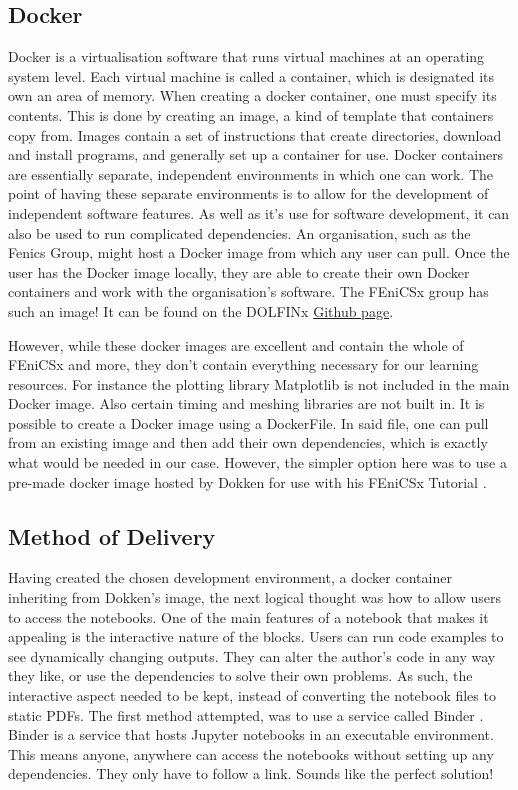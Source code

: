 \subsection{Docker} \label{subsection:docker}

Docker is a virtualisation software that runs virtual machines at an operating system level. Each virtual machine is called a container, which is designated its own an area of memory. When creating a docker container, one must specify its contents. This is done by creating an image, a kind of template that containers copy from. Images contain a set of instructions that create directories, download and install programs, and generally set up a container for use. Docker containers are essentially separate, independent environments in which one can work. The point of having these separate environments is to allow for the development of independent software features. As well as it's use for software development, it can also be used to run complicated dependencies. An organisation, such as the Fenics Group, might host a Docker image from which any user can pull. Once the user has the Docker image locally, they are able to create their own Docker containers and work with the organisation's software. The FEniCSx group has such an image! It can be found on the DOLFINx \href{https://github.com/FEniCS/dolfinx#docker-images}{Github page}. 

However, while these docker images are excellent and contain the whole of FEniCSx and more, they don't contain everything necessary for our learning resources. For instance the plotting library Matplotlib is not included in the main Docker image. Also certain timing and meshing libraries are not built in. It is possible to create a Docker image using a DockerFile. In said file, one can pull from an existing image and then add their own dependencies, which is exactly what would be needed in our case. However, the simpler option here was to use a pre-made docker image hosted by Dokken for use with his FEniCSx Tutorial \cite{dokken-docker}.

\subsection{Method of Delivery} \label{subsection:method-of-derlivery}

Having created the chosen development environment, a docker container inheriting from Dokken's image, the next logical thought was how to allow users to access the notebooks. One of the main features of a notebook that makes it appealing is the interactive nature of the blocks. Users can run code examples to see dynamically changing outputs. They can alter the author's code in any way they like, or use the dependencies to solve their own problems. As such, the interactive aspect needed to be kept, instead of converting the notebook files to static PDFs. The first method attempted, was to use a service called Binder \cite{binder}. Binder is a service that hosts Jupyter notebooks in an executable environment. This means anyone, anywhere can access the notebooks without setting up any dependencies. They only have to follow a link. Sounds like the perfect solution!

